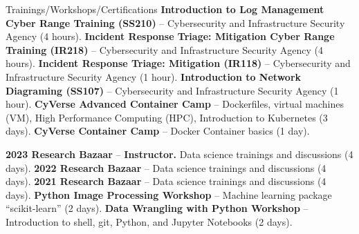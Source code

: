 \begin{rubric}{Trainings/Workshops/Certifications}
%
    \entry*[5/22/2025] \textbf{Introduction to Log Management Cyber Range Training (SS210)} -- Cybersecurity and Infrastructure Security Agency (4 hours). \href{https://github.com/amantaya/curriculum-vitae/blob/master/certifications/SS210_May22_2025_Course_Completion_Certificate.pdf}{\scriptsize\faLink}
%
    \entry*[5/15/2025] \textbf{Incident Response Triage: Mitigation Cyber Range Training (IR218)} -- Cybersecurity and Infrastructure Security Agency (4 hours). \href{https://github.com/amantaya/CV/blob/master/certifications/IR218_COA_051525.pdf}{\scriptsize\faLink}
%
    \entry*[5/12/2025] \textbf{Incident Response Triage: Mitigation (IR118)} -- Cybersecurity and Infrastructure Security Agency (1 hour). \href{https://github.com/amantaya/curriculum-vitae/blob/master/certifications/IR118_CoA_051225.pdf}{\scriptsize\faLink}
%
    \entry*[4/01/2025] \textbf{Introduction to Network Diagraming (SS107)} -- Cybersecurity and Infrastructure Security Agency (1 hour). \href{https://github.com/amantaya/CV/blob/master/certifications/SS107_APR1-2025_CertificateofAttendance.pdf}{\scriptsize\faLink}
%
    \entry*[5/2022] \textbf{CyVerse Advanced Container Camp} -- Dockerfiles, virtual machines (VM), High Performance Computing (HPC), Introduction to Kubernetes (3 days).
%
    \entry*[3/2021] \textbf{CyVerse Container Camp} -- Docker Container basics (1 day).

\entry*[4/2023] \textbf{2023 Research Bazaar} -- \textbf{Instructor.} Data science trainings and discussions (4 days).
\entry*[5/2022] \textbf{2022 Research Bazaar} -- Data science trainings and discussions (4 days).
\entry*[5/2021] \textbf{2021 Research Bazaar} -- Data science trainings and discussions (4 days).
\entry*[2/2020] \textbf{Python Image Processing Workshop} -- Machine learning package “scikit-learn” (2 days).
\entry*[2/2020] \textbf{Data Wrangling with Python Workshop} -- Introduction to shell, git, Python, and Jupyter Notebooks (2 days).


\end{rubric}
